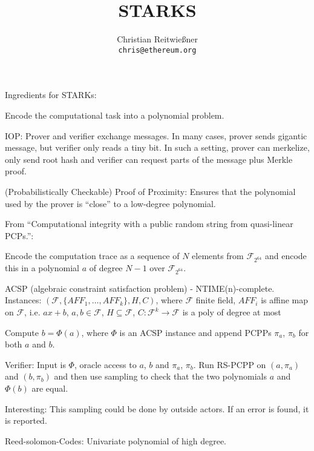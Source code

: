 \documentclass[11pt,letterpaper]{article}
\date{}
\begin{document}


\title{STARKS}

\author{Christian Reitwießner \\ 
{\tt chris@ethereum.org}}


\maketitle



Ingredients for STARKs:

Encode the computational task into a polynomial problem.

IOP: Prover and verifier exchange messages. In many cases, prover sends gigantic message, but verifier only reads a tiny bit.
In such a setting, prover can merkelize, only send root hash and verifier can request parts of the message plus Merkle proof.

(Probabilistically Checkable) Proof of Proximity: Ensures that the polynomial used by the prover is ``close'' to a low-degree polynomial.

From ``Computational integrity with a public random string from
quasi-linear PCPs.'':

Encode the computation trace as a sequence of $N$ elements from $\mathcal{F}_{2^64}$ and encode this in a polynomial $a$ of
degree $N-1$ over $\mathcal{F}_{2^64}$.

ACSP (algebraic constraint satisfaction problem) - NTIME(n)-complete.
  Instances: $(\mathcal{F}, \{AFF_1, \dots, AFF_k\}, H, C)$, where $\mathcal{F}$ finite field, $AFF_i$ is affine map on $\mathcal{F}$,
              i.e. $ax + b$, $a,b \in \mathcal{F}$, $H \subseteq \mathcal{F}$, $C\colon \mathcal{F}^k \to \mathcal{F}$ is a poly of
              degree at most $  $

Compute $b = \Phi(a)$, where $\Phi$ is an ACSP instance and append PCPPs $\pi_a$, $\pi_b$ for both $a$ and $b$.

Verifier: Input is $\Phi$, oracle access to $a$, $b$ and $\pi_a$, $\pi_b$.
Run RS-PCPP on $(a, \pi_a)$ and $(b, \pi_b)$ and then use sampling to check that the two polynomials
$a$ and $\Phi(b)$ are equal.

Interesting: This sampling could be done by outside actors. If an error is found, it is reported.

Reed-solomon-Codes: Univariate polynomial of high degree.
\end{document}
